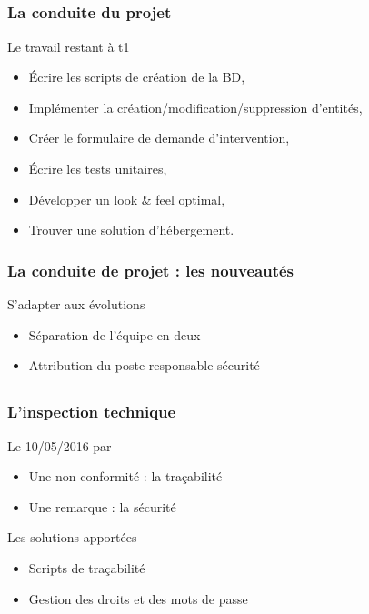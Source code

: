 \speaker{\Pierre{}}
\subsection{} %

\begin{frame}
\frametitle{La conduite du projet}
\begin{block}{Le travail restant à t1}
\begin{itemize}
	\item Écrire les scripts de création de la BD,
	\item Implémenter la création/modification/suppression d'entités,
	\item Créer le formulaire de demande d'intervention,
	\item Écrire les tests unitaires,
	\item Développer un look \& feel optimal,
	\item Trouver une solution d’hébergement.
	
\end{itemize}
\end{block}
\end{frame}

\begin{frame}
\frametitle{La conduite de projet : les nouveautés}
\begin{block}{S'adapter aux évolutions}
\begin{itemize}
	\item Séparation de l'équipe en deux
	\item Attribution du poste responsable sécurité
\end{itemize}
\end{block}

\end{frame}

\subsection{}
\begin{frame}
\frametitle{L'inspection technique}
\begin{block}{Le 10/05/2016 par \nomTuteurPedago{}}
\begin{itemize}
	\item Une non conformité : la traçabilité
	\item Une remarque : la sécurité
\end{itemize}
\end{block}
\begin{block}{Les solutions apportées}
\begin{itemize}
	\item Scripts de traçabilité
	\item Gestion des droits et des mots de passe
\end{itemize}
\end{block}
\end{frame}

